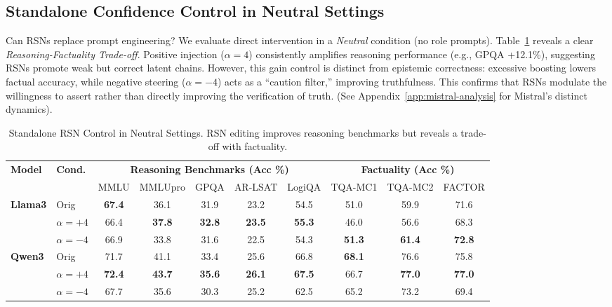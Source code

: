 \documentclass{article}
\begin{document}
\subsection{Standalone Confidence Control in Neutral Settings}
\label{sec:neutral-reasoning}
Can RSNs replace prompt engineering? We evaluate direct intervention in a \emph{Neutral} condition (no role prompts). Table~\ref{tab:neutral-combined} reveals a clear \emph{Reasoning-Factuality Trade-off}. Positive injection ($\alpha{=}4$) consistently amplifies reasoning performance (e.g., GPQA +12.1\%), suggesting RSNs promote weak but correct latent chains. However, this gain control is distinct from epistemic correctness: excessive boosting lowers factual accuracy, while negative steering ($\alpha{=}-4$) acts as a ``caution filter,'' improving truthfulness. This confirms that RSNs modulate the willingness to assert rather than directly improving the verification of truth. (See Appendix~\ref{app:mistral-analysis} for Mistral's distinct dynamics).

\begin{table}[t]
\centering
\small
\caption{Standalone RSN Control in Neutral Settings. RSN editing improves reasoning benchmarks but reveals a trade-off with factuality.}
\label{tab:neutral-combined}
\setlength{\tabcolsep}{3.5pt} 
\renewcommand{\arraystretch}{1.05}
\begin{tabular}{l l ccccc | ccc}
\toprule
\multirow{2}{*}{\textbf{Model}} & \multirow{2}{*}{\textbf{Cond.}} 
& \multicolumn{5}{c|}{\textbf{Reasoning Benchmarks (Acc \%)}} 
& \multicolumn{3}{c}{\textbf{Factuality (Acc \%)}} \\
& & MMLU & MMLUpro& GPQA & AR-LSAT & LogiQA 
& TQA-MC1 & TQA-MC2 & FACTOR \\
\midrule
\multirow{3}{*}{\textbf{Llama3}}
& Orig & \textbf{67.4} & 36.1 & 31.9 & 23.2 & 54.5 
& 51.0 & 59.9 & 71.6 \\
& $\alpha=+4$ & 66.4 & \textbf{37.8} & \textbf{32.8} & \textbf{23.5} & \textbf{55.3} 
& 46.0 & 56.6 & 68.3 \\
& $\alpha=-4$ & 66.9& 33.8& 31.6& 22.5& 54.3& \textbf{51.3} & \textbf{61.4} & \textbf{72.8} \\
\midrule
\multirow{3}{*}{\textbf{Qwen3}}
& Orig & 71.7 & 41.1 & 33.4 & 25.6 & 66.8 
& \textbf{68.1} & 76.6 & 75.8 \\
& $\alpha=+4$ & \textbf{72.4} & \textbf{43.7} & \textbf{35.6} & \textbf{26.1} & \textbf{67.5} 
& 66.7 & \textbf{77.0} & \textbf{77.0} \\
& $\alpha=-4$ & 67.7& 35.6& 30.3& 25.2& 62.5& 65.2 & 73.2 & 69.4 \\
\bottomrule
\end{tabular}
\end{table}
\end{document}
